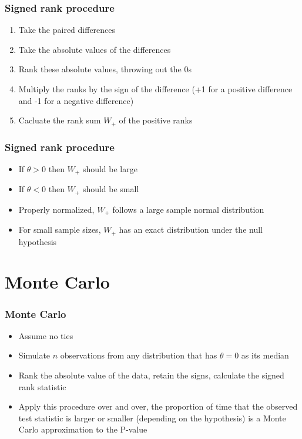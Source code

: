\documentclass[aspectratio=169]{beamer}
\begin{document}
\begin{frame}\frametitle{Signed rank procedure}
\begin{enumerate}
\item Take the paired differences
\item Take the absolute values of the differences
\item Rank these absolute values, throwing out the 0s
\item Multiply the ranks by the sign of the difference (+1 for a positive difference and -1 for
  a negative difference)
\item Cacluate the rank sum $W_+$ of the positive ranks
\end{enumerate}
\end{frame}

\begin{frame}\frametitle{Signed rank procedure}
\begin{itemize}
\item If $\theta > 0$ then $W_+$ should be large 
\item If $\theta < 0$ then $W_+$ should be small 
\item Properly normalized, $W_+$ follows a large sample normal distribution
\item For small sample sizes, $W_+$ has an exact distribution under the null hypothesis
\end{itemize}
\end{frame}

\section{Monte Carlo}
\begin{frame}\frametitle{Monte Carlo}
\begin{itemize}
\item Assume no ties
\item Simulate $n$ observations from any distribution that has $\theta = 0$ as
  its median
\item Rank the absolute value of the data, retain the signs, calculate
  the signed rank statistic
\item Apply this procedure over and over, the proportion of time that
  the observed test statistic is larger or smaller (depending on the hypothesis)
  is a Monte Carlo approximation to the P-value
\end{itemize}
\end{frame}
\end{document}
